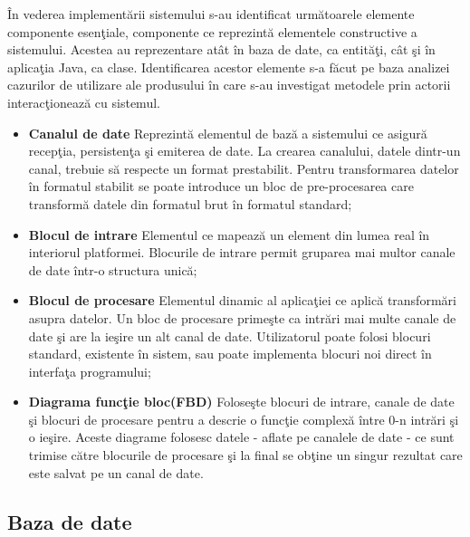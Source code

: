 În vederea implementării sistemului s-au identificat următoarele elemente componente esenţiale, componente ce reprezintă elementele constructive a sistemului. Acestea au reprezentare atât în baza de date, ca entităţi, cât şi în aplicaţia Java, ca clase. Identificarea acestor elemente s-a făcut pe baza analizei cazurilor de utilizare ale produsului în care s-au investigat metodele prin actorii interacţionează cu sistemul.
\begin{itemize}
	\label{list:entities}
	\item \textbf{Canalul de date} Reprezintă elementul de bază a sistemului ce asigură recepţia, persistenţa şi emiterea de date.  La crearea canalului, datele dintr-un canal, trebuie să respecte un format prestabilit. Pentru transformarea datelor în formatul stabilit se poate introduce un bloc de pre-procesarea care transformă datele din formatul brut în formatul standard;
	\item \textbf{Blocul de intrare} Elementul ce mapează un element din lumea real în interiorul platformei. Blocurile de intrare permit gruparea mai multor canale de date într-o structura unică;
	\item \textbf{Blocul de procesare} Elementul dinamic al aplicaţiei ce aplică transformări asupra datelor. Un bloc de procesare primeşte ca intrări mai multe canale de date şi are la ieşire un alt canal de date. Utilizatorul poate folosi blocuri standard, existente în sistem, sau poate implementa blocuri noi direct în interfaţa programului;
	\item \textbf{Diagrama funcţie bloc(FBD)} Foloseşte blocuri de intrare, canale de date şi blocuri de procesare pentru a descrie o funcţie complexă între 0-n intrări şi o ieşire. Aceste diagrame folosesc datele - aflate pe canalele de date - ce sunt trimise către blocurile de procesare şi la final se obţine un singur rezultat care este salvat pe un canal de date.
\end{itemize}

\subsection{Baza de date}

